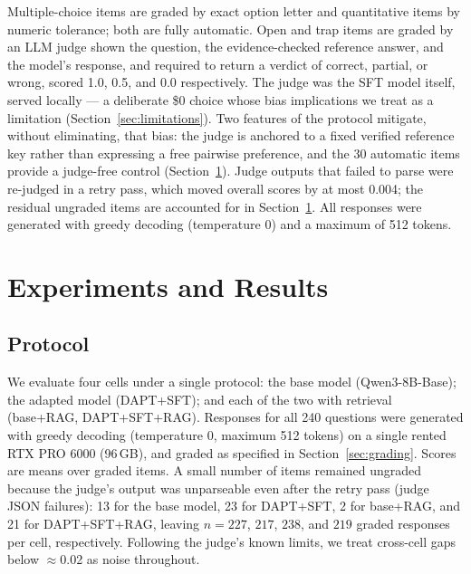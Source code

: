 \documentclass[11pt]{article}
\begin{document}
Multiple-choice items are graded by exact option letter and quantitative
items by numeric tolerance; both are fully automatic. Open and trap items
are graded by an LLM judge shown the question, the evidence-checked
reference answer, and the model's response, and required to return a
verdict of correct, partial, or wrong, scored 1.0, 0.5, and 0.0
respectively. The judge was the SFT model itself, served locally --- a
deliberate \$0 choice whose bias implications we treat as a limitation
(Section~\ref{sec:limitations}). Two features of the protocol mitigate,
without eliminating, that bias: the judge is anchored to a fixed verified
reference key rather than expressing a free pairwise preference, and the
30 automatic items provide a judge-free control
(Section~\ref{sec:experiments}). Judge outputs that failed to parse were
re-judged in a retry pass, which moved overall scores by at most 0.004;
the residual ungraded items are accounted for in
Section~\ref{sec:experiments}. All responses were generated with greedy
decoding (temperature 0) and a maximum of 512 tokens.

\section{Experiments and Results}
\label{sec:experiments}

\subsection{Protocol}

We evaluate four cells under a single protocol: the base model
(Qwen3-8B-Base); the adapted model (DAPT+SFT); and each of the two with
retrieval (base+RAG, DAPT+SFT+RAG). Responses for all 240 questions were
generated with greedy decoding (temperature 0, maximum 512 tokens) on a
single rented RTX PRO 6000 (96\,GB), and graded as specified in
Section~\ref{sec:grading}. Scores are means over graded items. A small
number of items remained ungraded because the judge's output was
unparseable even after the retry pass (judge JSON failures): 13 for the
base model, 23 for DAPT+SFT, 2 for base+RAG, and 21 for DAPT+SFT+RAG,
leaving $n = 227$, $217$, $238$, and $219$ graded responses per cell,
respectively. Following the judge's known limits, we treat cross-cell gaps
below $\approx$0.02 as noise throughout.
\end{document}
